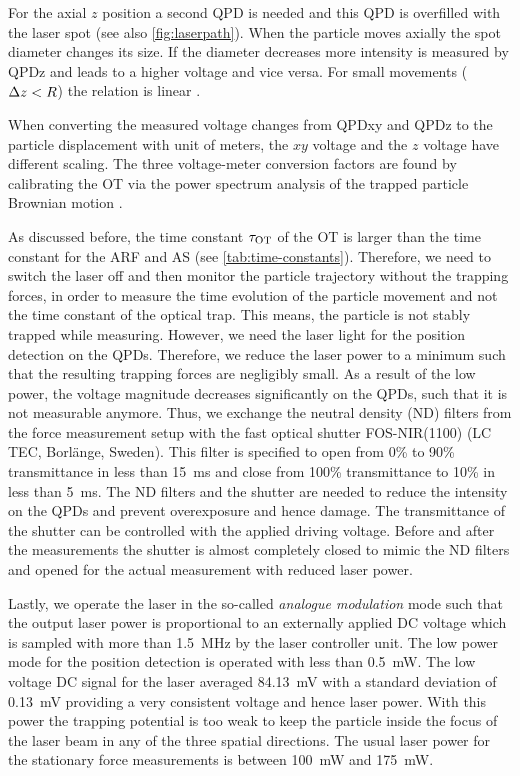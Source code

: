 For the axial $z$ position a second QPD is needed and this QPD is overfilled 
with the laser spot (see also \cref{fig:laserpath}). When the particle moves 
axially the spot diameter changes its size. If the diameter decreases more 
intensity is measured by QPDz and leads to a higher voltage and vice versa. For 
small movements ($\Delta z < R$) the relation is linear \cite{Dreyer2004}.

When converting the measured voltage changes from QPDxy and QPDz to the 
particle displacement with unit of meters, the $xy$ voltage and the $z$ voltage 
have different scaling. The three voltage-meter conversion factors are found by 
calibrating the OT via the power spectrum analysis of the trapped particle 
Brownian motion \cite{Lamprecht2021,Lamprecht2016,Lakaemper2015}.

As discussed before, the time constant $\tau_{\text{OT}}$ of the OT is larger than the 
time constant for the ARF and AS (see \cref{tab:time-constants}). Therefore, we 
need to switch the laser off and then monitor the particle trajectory without 
the trapping forces, in order to measure the time evolution of the particle 
movement and not the time constant of the optical trap. This means, the particle 
is not stably trapped while measuring. However, we need the laser light for 
the position detection on the QPDs. Therefore, we reduce the laser power to a 
minimum such that the resulting trapping forces are negligibly small. As a 
result of the low power, the voltage magnitude decreases significantly on the 
QPDs, such that it is not measurable anymore. Thus, we exchange the neutral 
density (ND) filters from the force measurement setup 
\cite{Lamprecht2016,Lamprecht2021} with the fast optical shutter FOS-NIR(1100) 
(LC TEC, Borlänge, Sweden). This filter is specified to open from 0\% to 90\% 
transmittance in less than \SI{15}{\ms} and close from 100\% transmittance to 
10\% in less than \SI{5}{\ms}. The ND filters and the shutter are needed to 
reduce the intensity on the QPDs and prevent overexposure and hence damage. 
The transmittance of the shutter can be controlled with the applied driving 
voltage. Before and after the measurements the shutter is almost completely 
closed to mimic the ND filters and opened for the actual measurement with 
reduced laser power.

Lastly, we operate the laser in the so-called \emph{analogue modulation} mode 
such that the output laser power is proportional to an externally applied DC 
voltage which is sampled with more than \SI{1.5}{\MHz} by the laser controller 
unit. The low power mode for the position detection is operated with less than 
\SI{0.5}{\mW}. The low voltage DC signal for the laser averaged \SI{84.13}{\mV} 
with a standard deviation of \SI{0.13}{\mV} providing a very consistent voltage 
and hence laser power. With this power the trapping potential is too weak to 
keep the particle inside the focus of the laser beam in any of the three 
spatial directions. The usual laser power for the stationary force measurements 
is between \SI{100}{\mW} and \SI{175}{\mW}.

